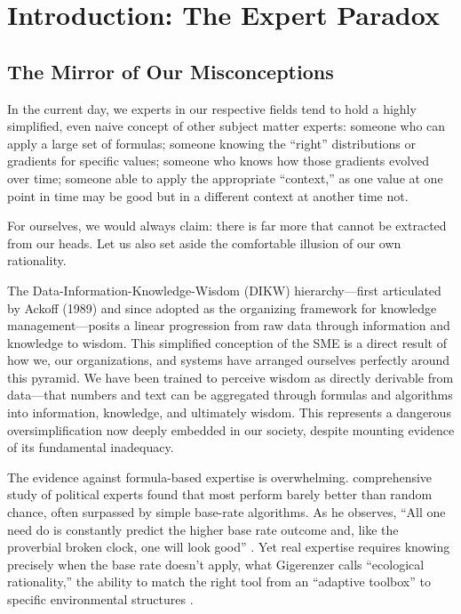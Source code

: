 \section{Introduction: The Expert Paradox}

\subsection{The Mirror of Our Misconceptions}

In the current day, we experts in our respective fields tend to hold a highly simplified, even naive concept of other subject matter experts: someone who can apply a large set of formulas; someone knowing the ``right'' distributions or gradients for specific values; someone who knows how those gradients evolved over time; someone able to apply the appropriate ``context,'' as one value at one point in time may be good but in a different context at another time not.

For ourselves, we would always claim: there is far more that cannot be extracted from our heads. Let us also set aside the comfortable illusion of our own rationality.

The Data-Information-Knowledge-Wisdom (DIKW) hierarchy—first articulated by Ackoff (1989) and since adopted as the organizing framework for knowledge management—posits a linear progression from raw data through information and knowledge to wisdom. This simplified conception of the SME is a direct result of how we, our organizations, and systems have arranged ourselves perfectly around this pyramid. We have been trained to perceive wisdom as directly derivable from data—that numbers and text can be aggregated through formulas and algorithms into information, knowledge, and ultimately wisdom. This represents a dangerous oversimplification now deeply embedded in our society, despite mounting evidence of its fundamental inadequacy.

The evidence against formula-based expertise is overwhelming. \citet{tetlock2005} comprehensive study of political experts found that most perform barely better than random chance, often surpassed by simple base-rate algorithms. As he observes, ``All one need do is constantly predict the higher base rate outcome and, like the proverbial broken clock, one will look good'' \citep{tetlock2005}. Yet real expertise requires knowing precisely when the base rate doesn't apply, what Gigerenzer calls ``ecological rationality,'' the ability to match the right tool from an ``adaptive toolbox'' to specific environmental structures \citep{gigerenzer2001}.

